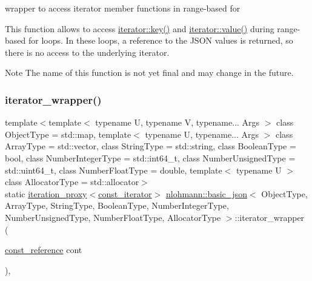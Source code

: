 wrapper to access iterator member functions in range-\/based for 

This function allows to access \hyperlink{classnlohmann_1_1basic__json_1_1const__iterator_a0e717ab658d27f646a3c8602cac91d83}{iterator\+::key()} and \hyperlink{classnlohmann_1_1basic__json_1_1iterator_ac688806417f3b4e17c4eb1b661b522f1}{iterator\+::value()} during range-\/based for loops. In these loops, a reference to the J\+S\+ON values is returned, so there is no access to the underlying iterator.

\begin{DoxyNote}{Note}
The name of this function is not yet final and may change in the future. 
\end{DoxyNote}
\hypertarget{classnlohmann_1_1basic__json_af148cdab12df5bf86119fac735ccaac5}{}\label{classnlohmann_1_1basic__json_af148cdab12df5bf86119fac735ccaac5} 
\subsubsection{\texorpdfstring{iterator\+\_\+wrapper()}{iterator\_wrapper()}\hspace{0.1cm}{\footnotesize\ttfamily [2/2]}}
{\footnotesize\ttfamily template$<$template$<$ typename U, typename V, typename... Args $>$ class Object\+Type = std\+::map, template$<$ typename U, typename... Args $>$ class Array\+Type = std\+::vector, class String\+Type  = std\+::string, class Boolean\+Type  = bool, class Number\+Integer\+Type  = std\+::int64\+\_\+t, class Number\+Unsigned\+Type  = std\+::uint64\+\_\+t, class Number\+Float\+Type  = double, template$<$ typename U $>$ class Allocator\+Type = std\+::allocator$>$ \\
static \hyperlink{classnlohmann_1_1basic__json_1_1iteration__proxy}{iteration\+\_\+proxy}$<$\hyperlink{classnlohmann_1_1basic__json_1_1const__iterator}{const\+\_\+iterator}$>$ \hyperlink{classnlohmann_1_1basic__json}{nlohmann\+::basic\+\_\+json}$<$ Object\+Type, Array\+Type, String\+Type, Boolean\+Type, Number\+Integer\+Type, Number\+Unsigned\+Type, Number\+Float\+Type, Allocator\+Type $>$\+::iterator\+\_\+wrapper (\begin{DoxyParamCaption}\item[{\hyperlink{classnlohmann_1_1basic__json_af677a29b0e66edc9f66e5167e4667071}{const\+\_\+reference}}]{cont }\end{DoxyParamCaption})\hspace{0.3cm}{\ttfamily [inline]}, {\ttfamily [static]}}



